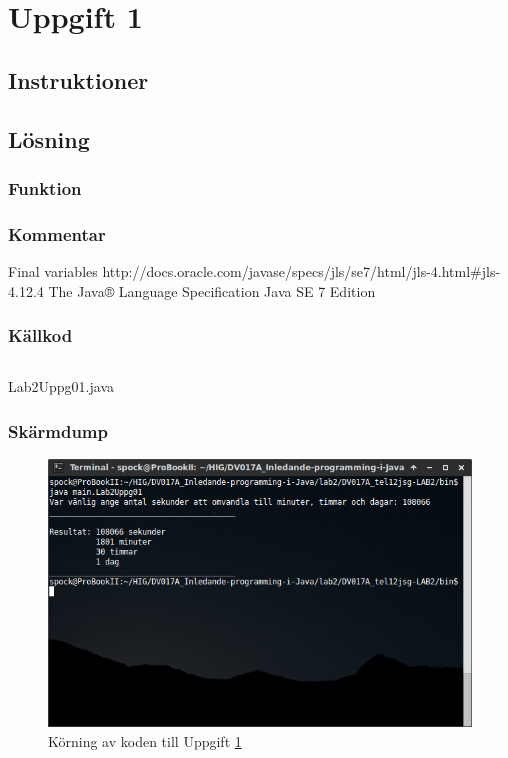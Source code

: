 \section{Uppgift 1}\label{sec:uppg01}

\subsection{Instruktioner}


\subsection{Lösning}
\subsubsection{Funktion}

\subsubsection{Kommentar}

\citep{jle:static}

Final variables
http://docs.oracle.com/javase/specs/jls/se7/html/jls-4.html#jls-4.12.4
The Java® Language Specification
Java SE 7 Edition


\subsubsection{Källkod}
\inputminted[linenos]{java}{src/Lab2Uppg01.java}
\caption{Lab2Uppg01.java}
\label{src:uppg01}


\subsubsection{Skärmdump}
\begin{figure}[htbp]
    \centering
        \includegraphics[width=\linewidth]{img/01.png}
    \caption{Körning av koden till Uppgift \ref{sec:uppg01}}
    \label{fig:uppg01-screenshot}
\end{figure}

